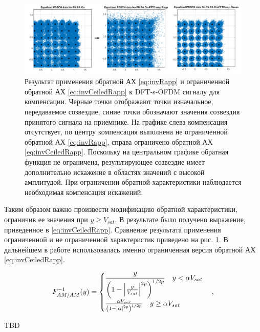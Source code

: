 \begin{figure}[h!]
    \centering
    \includegraphics[width=0.9\linewidth]{figs/ceiled_rapp_result.png}
    \caption{Результат применения обратной АХ \ref{eq:invRapp} и
    ограниченной обратной АХ \ref{eq:invCeiledRapp} к DFT-s-OFDM сигналу
    для компенсации. Черные точки отображают точки изначальное,
    передаваемое созвездие, синие точки обозначают значения созвездия
    принятого сигнала на приемнике. На графике слева компенсация
    отсутствует, по центру компенсация выполнена не ограниченной обратной
    АХ \ref{eq:invRapp}, справа ограничено обратной АХ
    \ref{eq:invCeiledRapp}. Поскольку на центральном графике обратная
    функция не ограничена, результирующее созвездие имеет дополнительно
    искажение в областях значений с высокой амплитудой. При ограничении
    обратной характеристики наблюдается необходимая компенсация искажений.}
    \label{fig:inf_distortion}
\end{figure}

Таким образом важно произвести модификацию обратной характеристики,
ограничив ее значения при $y \geq V_{sat}$. В результате было получено
выражение, приведенное в \ref{eq:invCeiledRapp}. Сравнение результата
применения ограниченной и не ограниченной характеристик приведено на рис.
\ref{fig:inf_distortion}. В дальнейшем в работе использовалась именно
ограниченная версия обратной АХ \ref{eq:invCeiledRapp}.

\begin{equation}
    F^{-1}_{AM/AM}(y) = 
    \begin{cases}
        \displaystyle
       \frac{ y}{\left( 1 - \abs{\frac{y}{V_{sat}}}^{2p}\right)^{1/2p}}
       \quad y <\alpha V_{sat}\\
       \frac{ \alpha V_{sat}}{\left( 1 - \abs{\alpha}^{2p}\right)^{1/2p}}
       \quad y \geq \alpha V_{sat}
    \end{cases},
    \label{eq:invCeiledRapp}
\end{equation}




TBD





